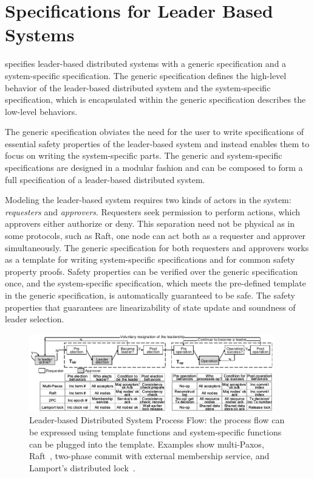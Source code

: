 
\section{Specifications for Leader Based Systems}
\label{chapter:witnesspassing:sec:specs-for-leader-based-system}

\sysname{} specifies leader-based distributed systems with a generic
specification and a system-specific specification. 
The generic specification defines the high-level behavior of the leader-based 
distributed system and the system-specific specification, which is encapsulated 
within the generic specification describes the low-level behaviors. 

The generic specification obviates the need for the user to write specifications
of essential safety properties of the leader-based system and instead enables them to
focus on writing the system-specific parts. The
generic and system-specific specifications are designed in a modular fashion and
can be composed to form a full specification of a leader-based distributed system.

Modeling the leader-based system requires two kinds of actors in the system:
\textit{requesters} and \textit{approvers}. 
Requesters seek permission to perform actions, which approvers either authorize or deny.
This separation need not be physical as in some protocols, such as Raft, one node can act
both as a requester and approver simultaneously.
The generic specification for both requesters and approvers 
works as a template for writing system-specific
specifications and for common safety property proofs.
Safety properties can be verified over the generic specification once,
and the system-specific specification, which meets the pre-defined template in
the generic specification, is automatically guaranteed to be safe. The safety
properties that \sysname{} guarantees are linearizability of state update and
soundness of leader selection.

\begin{figure}
\includegraphics[width=0.95\textwidth]{figs/witnesspassing/overviewfig}
\caption{Leader-based Distributed System Process Flow: the process flow can be
	expressed using template functions and system-specific functions can
	be plugged into the template. Examples show multi-Paxos, 
	Raft~\cite{raft}, two-phase commit with external membership service, 
	and Lamport's distributed lock~\cite{lamportclock}.}
\label{fig:chapter:witnesspassing:process-flow}
\end{figure}

